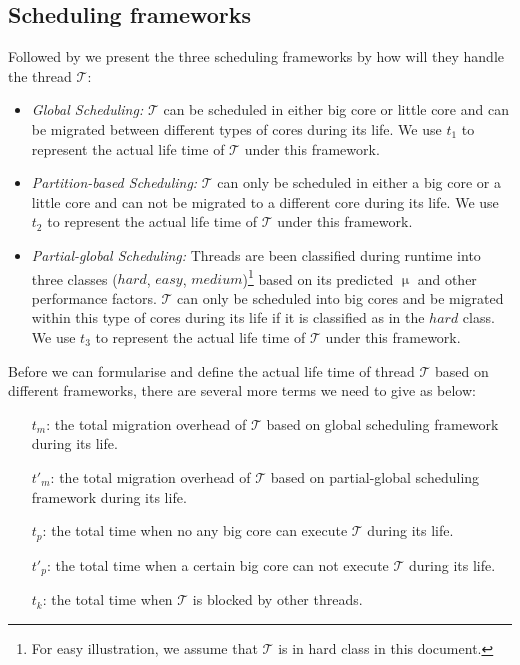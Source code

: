 \documentclass[pageno]{jpaper}
\begin{document}
\subsection{Scheduling frameworks}
Followed by we present the three scheduling frameworks by how will they handle the thread $\mathcal{T}$:
\begin{itemize}
\item {\it Global Scheduling:} $\mathcal{T}$ can be scheduled in either big core or little core and can be migrated between different types of cores during its life. We use $t_1$ to represent the actual life time of $\mathcal{T}$ under this framework. 
\item {\it Partition-based Scheduling:} $\mathcal{T}$ can only be scheduled in either a big core or a little core and can not be migrated to a different core during its life. We use $t_2$ to represent the actual life time of $\mathcal{T}$ under this framework. 
\item{\it Partial-global Scheduling:} Threads are been classified during runtime into three classes ($hard$, $easy$, $medium$)\footnote{For easy illustration, we assume that  $\mathcal{T}$ is in hard class in this document.} based on its predicted $\upmu$ and other performance factors. $\mathcal{T}$ can only be scheduled into big cores and be migrated within this type of cores during its life if it is classified as in the $hard$ class. We use $t_3$ to represent the actual life time of $\mathcal{T}$ under this framework. 
\end{itemize}

Before we can formularise and define the actual life time of thread $\mathcal{T}$ based on different frameworks, there are several more terms we need to give as below:

\begin{itemize}
\item[$t_m$:] the total migration overhead of $\mathcal{T}$ based on global scheduling framework during its life.
\item[$t'_m$:] the total migration overhead of $\mathcal{T}$ based on partial-global scheduling framework during its life.
\item[$t_p$:] the total time when no any big core can execute $\mathcal{T}$ during its life.
\item[$t'_p$:] the total time when a certain big core can not execute $\mathcal{T}$ during its life.
\item[$t_k$:] the total time when $\mathcal{T}$ is blocked by other threads.
\end{itemize}
\end{document}
